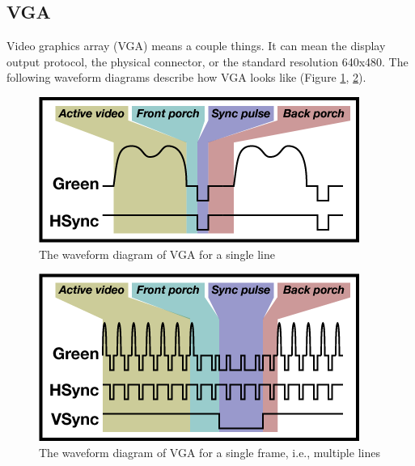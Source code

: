 \documentclass{article}
\begin{document}
	\subsection{VGA}
		Video graphics array (VGA) means a couple things. It can mean the display output protocol, the physical connector, or the standard resolution 640x480. The following waveform diagrams describe how VGA looks like (Figure \ref{fig:vgaline}, \ref{fig:vgaframe}).
	\begin{figure}[h]
		\centering
		\includegraphics[scale=0.8]{vgaline}
		\caption{The waveform diagram of VGA for a single line}
		\label{fig:vgaline}
	\end{figure}
	\begin{figure}[h]
		\centering
		\includegraphics[scale=0.8]{vgaframe}
		\caption{The waveform diagram of VGA for a single frame, i.e., multiple lines}
		\label{fig:vgaframe}
	\end{figure}
	\\
	
\end{document}
